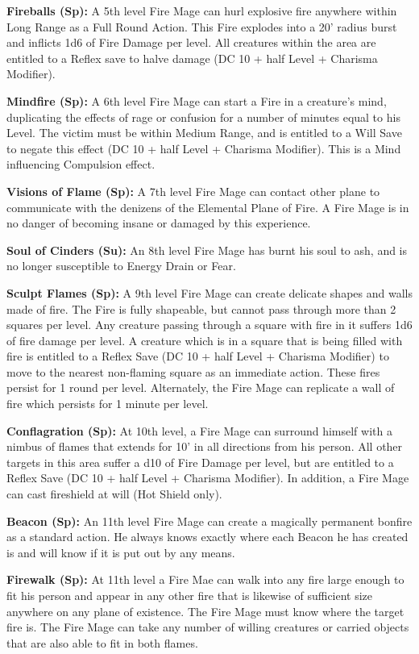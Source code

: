 \textbf{Fireballs (Sp):} A 5th level Fire Mage can hurl explosive fire anywhere within Long Range as a Full Round Action. This Fire explodes into a 20' radius burst and inflicts 1d6 of Fire Damage per level. All creatures within the area are entitled to a Reflex save to halve damage (DC 10 + half Level + Charisma Modifier).

\textbf{Mindfire (Sp):} A 6th level Fire Mage can start a Fire in a creature's mind, duplicating the effects of rage or confusion for a number of minutes equal to his Level. The victim must be within Medium Range, and is entitled to a Will Save to negate this effect (DC 10 + half Level + Charisma Modifier). This is a Mind influencing Compulsion effect.

\textbf{Visions of Flame (Sp):} A 7th level Fire Mage can contact other plane to communicate with the denizens of the Elemental Plane of Fire. A Fire Mage is in no danger of becoming insane or damaged by this experience.

\textbf{Soul of Cinders (Su):} An 8th level Fire Mage has burnt his soul to ash, and is no longer susceptible to Energy Drain or Fear.

\textbf{Sculpt Flames (Sp):} A 9th level Fire Mage can create delicate shapes and walls made of fire. The Fire is fully shapeable, but cannot pass through more than 2 squares per level. Any creature passing through a square with fire in it suffers 1d6 of fire damage per level. A creature which is in a square that is being filled with fire is entitled to a Reflex Save (DC 10 + half Level + Charisma Modifier) to move to the nearest non-flaming square as an immediate action. These fires persist for 1 round per level. Alternately, the Fire Mage can replicate a wall of fire which persists for 1 minute per level.

\textbf{Conflagration (Sp):} At 10th level, a Fire Mage can surround himself with a nimbus of flames that extends for 10' in all directions from his person. All other targets in this area suffer a d10 of Fire Damage per level, but are entitled to a Reflex Save (DC 10 + half Level + Charisma Modifier). In addition, a Fire Mage can cast fireshield at will (Hot Shield only).

\textbf{Beacon (Sp):} An 11th level Fire Mage can create a magically permanent bonfire as a standard action. He always knows exactly where each Beacon he has created is and will know if it is put out by any means.

\textbf{Firewalk (Sp):} At 11th level a Fire Mae can walk into any fire large enough to fit his person and appear in any other fire that is likewise of sufficient size anywhere on any plane of existence. The Fire Mage must know where the target fire is. The Fire Mage can take any number of willing creatures or carried objects that are also able to fit in both flames.

